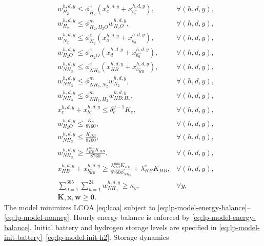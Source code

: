 \documentclass[11pt, letter]{article}
\begin{document}
\begin{subequations}
\begin{align}
& w_{H_2}^{h,d,y} \le \phi_{H_2}^e (x_e^{h,d,y} + x_{b^-_e}^{h,d,y}), & \forall (h,d,y), \label{eq:lp-model-h2-from-electricity} \\
& w_{H_2}^{h,d,y} \le \phi_{H_2,H_2O}^m w_{H_2O}^{h,d,y}, & \forall (h,d,y), \label{eq:lp-model-h2-from-water} \\
& w_{N_2}^{h,d,y} \le \phi_{N_2}^e (x_a^{h,d,y} + x_{b^-_a}^{h,d,y}), & \forall (h,d,y), \label{eq:lp-model-n2} \\
& w_{H_2O}^{h,d,y} \le \phi_{H_2O}^e (x_d^{h,d,y} + x_{b^-_d}^{h,d,y}), & \forall (h,d,y), \label{eq:lp-model-h2o} \\
& w_{NH_3}^{h,d,y} \le \phi^e_{NH_3} (x_{HB}^{h,d,y} + x_{b^-_{HB}}^{h,d,y}), & \forall (h,d,y), \label{eq:lp-model-nh3-from-electricity} \\
& w_{NH_3}^{h,d,y} \le \phi_{NH_3,N_2}^m w_{N_2}^{h,d,y}, & \forall (h,d,y), \label{eq:lp-model-nh3-from-n2} \\
& w_{NH_3}^{h,d,y} \le \phi_{NH_3,H_2}^m w_{HB:H_2}^{h,d,y}, & \forall (h,d,y), \label{eq:lp-model-nh3-from-h2} \\
& x_e^{h,d,y} + x_{b^-_e}^{h,d,y} \le \delta_e^{y-1} K_e, & \forall (h,d,y), \label{eq:lp-model-electrolyzer-cap} \\
& w_{H_2O}^{h,d,y} \le \frac{K_d}{8760}, & \forall (h,d,y), \label{eq:lp-model-h2o-cap} \\
& w_{NH_3}^{h,d,y} \le \frac{K_{HB}}{8760}, & \forall (h,d,y), \label{eq:lp-model-nh3-cap} \\
& w_{NH_3}^{h,d,y} \ge \frac{\lambda_{HB}^\text{min} K_{HB}}{8760}, & \forall (h,d,y), \label{eq:lp-model-min-load-nh3} \\
& x_{HB}^{h,d,y} + x_{b^-_{HB}}^{h,d,y} \ge \frac{\lambda_{HB}^{\min} K_{HB}}{8760  \phi^e_{NH_3}} + \lambda^e_{HB}K_{HB}, & \forall (h,d,y), \label{eq:lp-model-min-energy-hb} \\
& \sum_{d=1}^{365} \sum_{h=1}^{24} w_{NH_3}^{h,d,y} \ge \kappa_y, & \forall y, \label{eq:lp-model-annual-target} \\
& \boldsymbol{K,x,w} \ge \boldsymbol{0}. \label{eq:lp-model-nonneg}
\end{align}

\end{subequations}
The model minimizes LCOA \eqref{eq:lcoa} subject to
\eqref{eq:lp-model-energy-balance}--\eqref{eq:lp-model-nonneg}. Hourly energy
balance is enforced by \eqref{eq:lp-model-energy-balance}. Initial battery and
hydrogen storage levels are specified in
\eqref{eq:lp-model-init-battery}--\eqref{eq:lp-model-init-h2}. Storage dynamics
\end{document}
